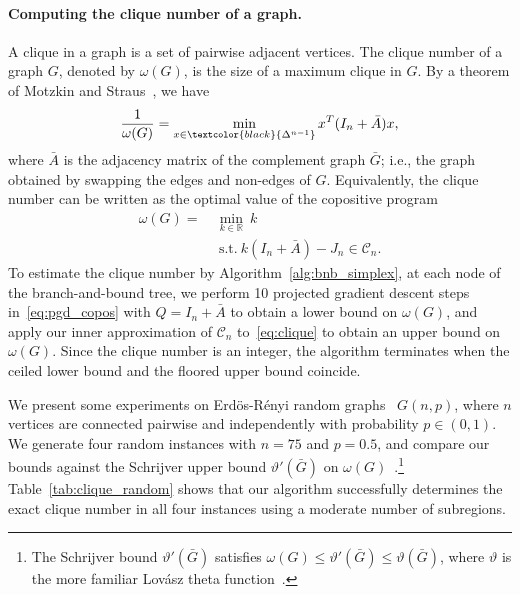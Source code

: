 \documentclass[12pt]{article}
\newcommand{\reals}{\mathbb{R}}
\newcommand{\st}{\text{s.t.}}
\newcommand{\mcC}{\mathcal{C}}
\theoremstyle{remark}
\begin{document}
\paragraph{Computing the clique number of a graph.}
A clique in a graph is a set of pairwise adjacent vertices. The clique number of a graph $G$, denoted by $\omega(G)$, is the size of a maximum
clique in $G$. 
By a theorem of Motzkin and Straus~\cite{Motzkin1965}, we have
\[\frac{1}{\omega(G)}=\min\limits_{x\in\textcolor{black}{\Delta^{n-1}}} x^T(I_n+\bar{A})x,\]
where $\bar{A}$ is the adjacency matrix of the complement graph $\bar{G}$; i.e., the graph obtained by swapping the edges and non-edges of $G$. Equivalently, the clique number can be written as the optimal value of the copositive program
\begin{equation}\label{eq:clique}
\begin{aligned}
    \omega(G)=\ &\min_{k\in\reals}\ k\\
    &\ \st\ k(I_n+\bar{A}) - J_n\in\mcC_n.
\end{aligned}    
\end{equation}
To estimate the clique number by Algorithm~\ref{alg:bnb_simplex}, at each node of the branch-and-bound tree, we perform 10 projected gradient descent steps in~\eqref{eq:pgd_copos} with $Q=I_n+\bar{A}$ to obtain a lower bound on $\omega(G)$, and apply our inner approximation of $\mcC_n$ to~\eqref{eq:clique} to obtain an upper bound on $\omega(G)$. 
Since the clique number is an integer, the algorithm terminates when the ceiled lower bound and the floored upper bound coincide.

We present some experiments on Erd\"os-R\'enyi random graphs~\cite{Erdos1959} $G(n,p)$, where $n$ vertices are connected pairwise and independently with probability $p\in(0,1)$. 
We generate four random instances with $n=75$ and $p=0.5$, and compare our bounds against the Schrijver upper bound $\vartheta'(\bar{G})$ on $\omega(G)$~\cite{Schrijver1979}.\footnote{The Schrijver bound $\vartheta'(\bar{G})$ satisfies $\omega(G)\leq \vartheta'(\bar{G}) \leq \vartheta(\bar{G})$, where $\vartheta$ is the more familiar Lov\'asz theta function~\cite{Lovasz1979}.} 
Table~\ref{tab:clique_random} shows that our algorithm successfully determines the exact clique number in all four instances using a moderate number of subregions.
\end{document}
